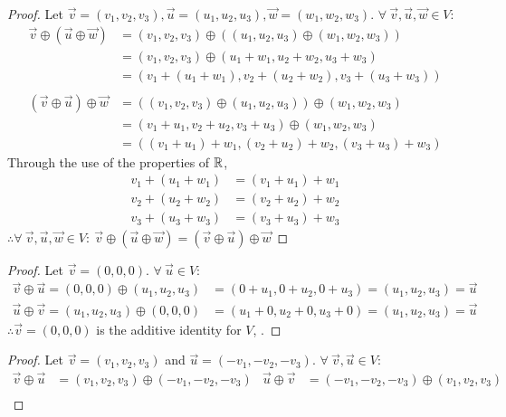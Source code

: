 \begin{enumerate}
\begin{proof}
    Let $\vec{v}=(v_1,v_2,v_3),\vec{u}=(u_1,u_2,u_3),\vec{w}=(w_1,w_2,w_3)$. $\forall~\vec{v},\vec{u},\vec{w} \in V$:
    \begin{align*}
      \vec{v} \oplus (\vec{u} \oplus \vec{w}) & = (v_1,v_2,v_3) \oplus ((u_1,u_2,u_3) \oplus (w_1,w_2,w_3)) \\
                                              & = (v_1,v_2,v_3) \oplus (u_1+w_1,u_2+w_2,u_3+w_3)            \\
                                              & = (v_1+(u_1+w_1),v_2+(u_2+w_2),v_3+(u_3+w_3))               \\ \\
      (\vec{v} \oplus \vec{u}) \oplus \vec{w} & = ((v_1,v_2,v_3) \oplus (u_1,u_2,u_3)) \oplus (w_1,w_2,w_3) \\
                                              & = (v_1+u_1,v_2+u_2,v_3+u_3) \oplus (w_1,w_2,w_3)            \\
                                              & = ((v_1+u_1)+w_1,(v_2+u_2)+w_2,(v_3+u_3)+w_3)
    \end{align*}
    Through the use of the properties of $\mathbb{R}$,
    \begin{align*}
      v_1+(u_1+w_1) & = (v_1+u_1)+w_1 \\
      v_2+(u_2+w_2) & = (v_2+u_2)+w_2 \\
      v_3+(u_3+w_3) & = (v_3+u_3)+w_3
    \end{align*}
    $\therefore \forall~\vec{v},\vec{u},\vec{w} \in V:~\vec{v} \oplus (\vec{u} \oplus \vec{w}) = (\vec{v} \oplus \vec{u}) \oplus \vec{w}$
  \end{proof}
  \begin{proof}
    Let $\vec{v} = (0,0,0)$. $\forall~\vec{u} \in V$:
    \begin{align*}
      \vec{v} \oplus \vec{u} = (0,0,0) \oplus (u_1,u_2,u_3) & = (0+u_1,0+u_2,0+u_3) = (u_1,u_2,u_3) = \vec{u} \\
      \vec{u} \oplus \vec{v} = (u_1,u_2,u_3) \oplus (0,0,0) & = (u_1+0,u_2+0,u_3+0) = (u_1,u_2,u_3) = \vec{u}
    \end{align*}
    $\therefore \vec{v} = (0,0,0)$ is the additive identity for $V$, .
  \end{proof}
  \begin{proof}
    Let $\vec{v} = (v_1,v_2,v_3)$ and $\vec{u} = (-v_1,-v_2,-v_3)$. $\forall~\vec{v},\vec{u} \in V$:
    \begin{align*}
      \vec{v} \oplus \vec{u} & = (v_1,v_2,v_3) \oplus (-v_1,-v_2,-v_3) & \vec{u} \oplus \vec{v} & = (-v_1,-v_2,-v_3) \oplus (v_1,v_2,v_3) \\

\end{align*}
\end{proof}
\end{enumerate}

